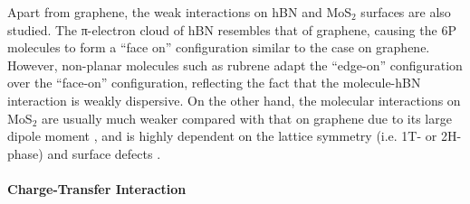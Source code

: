 Apart from graphene, the weak interactions on hBN and
MoS\(_{\text{2}}\) surfaces are also studied. The π-electron cloud of
hBN resembles that of graphene, causing the 6P molecules to form a
``face on'' configuration \cite{Matkovic_2016_6P_hBN} similar to the
case on graphene. However, non-planar molecules such as rubrene
\cite{Lee_2014_rubene_hBN} adapt the ``edge-on'' configuration over the ``face-on'' configuration, reflecting the fact
that the molecule-hBN interaction is weakly dispersive.
%
On the other hand, the molecular
interactions on MoS$_{2}$ are usually much weaker compared with that on
graphene due to its large dipole moment \cite{Rajan_2016_wett_mos2},
and is highly dependent on the lattice symmetry
\cite{Shen_2017_DFT_mos2_pent} (i.e. 1T- or 2H- phase) and surface
defects \cite{Jariwala_2016_Mos2_pentacene,
  Kim_2016_trap_Mos2_pent}.

\paragraph{Charge-Transfer Interaction}
\label{sec:orgebfad7b}

